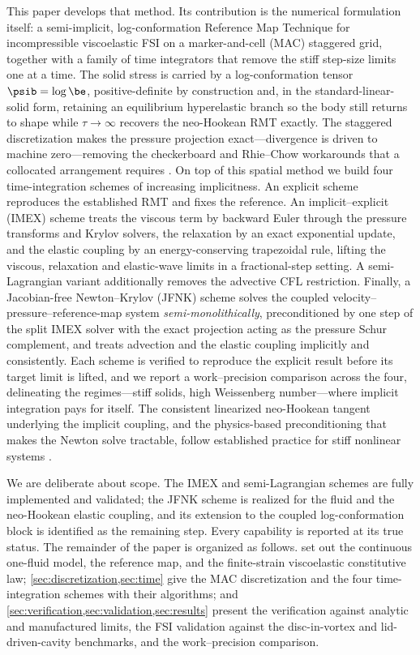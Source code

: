 This paper develops that method. Its contribution is the numerical formulation itself:
a semi-implicit, log-conformation Reference Map Technique for incompressible
viscoelastic FSI on a marker-and-cell (MAC) staggered grid, together with a family of
time integrators that remove the stiff step-size limits one at a time. The solid stress
is carried by a log-conformation tensor $\psib=\log\be$, positive-definite by
construction and, in the standard-linear-solid form, retaining an equilibrium
hyperelastic branch so the body still returns to shape while $\tau\!\to\!\infty$
recovers the neo-Hookean RMT exactly. The staggered discretization makes the pressure
projection exact---divergence is driven to machine zero---removing the
checkerboard and Rhie--Chow workarounds that a collocated arrangement requires
\cite{Harlow1965,Chorin1968,Brown2001}. On top of this spatial method we build four
time-integration schemes of increasing implicitness. An explicit scheme reproduces the
established RMT and fixes the reference. An implicit--explicit (IMEX) scheme treats the
viscous term by backward Euler through the pressure transforms and Krylov solvers, the
relaxation by an exact exponential update, and the elastic coupling by an
energy-conserving trapezoidal rule, lifting the viscous, relaxation and elastic-wave
limits in a fractional-step setting. A semi-Lagrangian variant additionally removes the
advective CFL restriction. Finally, a Jacobian-free Newton--Krylov (JFNK) scheme solves
the coupled velocity--pressure--reference-map system \emph{semi-monolithically},
preconditioned by one step of the split IMEX solver with the exact projection acting as
the pressure Schur complement, and treats advection and the elastic coupling implicitly
and consistently. Each scheme is verified to reproduce the explicit result before its
target limit is lifted, and we report a work--precision comparison across the four,
delineating the regimes---stiff solids, high Weissenberg number---where implicit
integration pays for itself. The consistent linearized neo-Hookean tangent underlying
the implicit coupling, and the physics-based preconditioning that makes the Newton
solve tractable, follow established practice for stiff nonlinear systems
\cite{Knoll2004,Kelley1995,Ascher1997,Reese1998,Simo1998}.

We are deliberate about scope. The IMEX and semi-Lagrangian schemes are fully
implemented and validated; the JFNK scheme is realized for the fluid and the
neo-Hookean elastic coupling, and its extension to the coupled log-conformation block
is identified as the remaining step. Every capability is reported at its true status.
The remainder of the paper is organized as follows.
 set out the continuous one-fluid model,
the reference map, and the finite-strain viscoelastic constitutive law;
\cref{sec:discretization,sec:time} give the MAC discretization and the four
time-integration schemes with their algorithms;
and \cref{sec:verification,sec:validation,sec:results} present the verification against
analytic and manufactured limits, the FSI validation against the disc-in-vortex and
lid-driven-cavity benchmarks, and the work--precision comparison.
